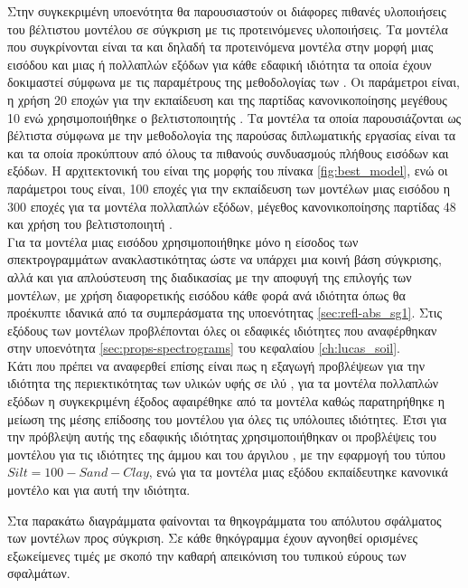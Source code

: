 Στην συγκεκριμένη υποενότητα θα παρουσιαστούν οι διάφορες πιθανές υλοποιήσεις του βέλτιστου μοντέλου σε σύγκριση με τις προτεινόμενες υλοποιήσεις. Τα μοντέλα που συγκρίνονται είναι τα  και  δηλαδή τα προτεινόμενα μοντέλα στην μορφή μιας εισόδου και μιας ή πολλαπλών εξόδων για κάθε εδαφική ιδιότητα τα οποία έχουν δοκιμαστεί σύμφωνα με τις παραμέτρους της μεθοδολογίας των . Οι παράμετροι είναι, η χρήση 20 εποχών για την εκπαίδευση και της παρτίδας κανονικοποίησης μεγέθους 10 ενώ χρησιμοποιήθηκε ο βελτιστοποιητής . Τα μοντέλα τα οποία παρουσιάζονται ως βέλτιστα σύμφωνα με την μεθοδολογία της παρούσας διπλωματικής εργασίας είναι τα  και  τα οποία προκύπτουν από όλους τα πιθανούς συνδυασμούς πλήθους εισόδων και εξόδων. Η αρχιτεκτονική του είναι της μορφής του πίνακα \ref{fig:best_model}, ενώ οι παράμετροι τους είναι, 100 εποχές για την εκπαίδευση των μοντέλων μιας εισόδου η 300 εποχές για τα μοντέλα πολλαπλών εξόδων, μέγεθος κανονικοποίησης παρτίδας 48 και χρήση του βελτιστοποιητή .\\

Για τα μοντέλα μιας εισόδου χρησιμοποιήθηκε μόνο η είσοδος των σπεκτρογραμμάτων ανακλαστικότητας ώστε να υπάρχει μια κοινή βάση σύγκρισης, αλλά και για απλούστευση της διαδικασίας με την αποφυγή της επιλογής των μοντέλων, με χρήση διαφορετικής εισόδου κάθε φορά ανά ιδιότητα όπως θα προέκυπτε ιδανικά από τα συμπεράσματα της υποενότητας \ref{sec:refl-abs_sg1}. Στις εξόδους των μοντέλων προβλέπονται όλες οι εδαφικές ιδιότητες που αναφέρθηκαν στην υποενότητα \ref{sec:props-spectrograms} του κεφαλαίου \ref{ch:lucas_soil}.\\

Κάτι που πρέπει να αναφερθεί επίσης είναι πως η εξαγωγή προβλέψεων για την ιδιότητα της περιεκτικότητας των υλικών υφής σε ιλύ , για τα μοντέλα πολλαπλών εξόδων η συγκεκριμένη έξοδος αφαιρέθηκε από τα μοντέλα καθώς παρατηρήθηκε η μείωση της μέσης επίδοσης του μοντέλου για όλες τις υπόλοιπες ιδιότητες. Έτσι για την πρόβλεψη αυτής της εδαφικής ιδιότητας χρησιμοποιήθηκαν οι προβλέψεις του μοντέλου για τις ιδιότητες της άμμου  και του άργιλου , με την εφαρμογή του τύπου $Silt=100-Sand-Clay$, ενώ για τα μοντέλα μιας εξόδου εκπαίδευτηκε κανονικά μοντέλο και για αυτή την ιδιότητα. 


Στα παρακάτω διαγράμματα φαίνονται τα θηκογράμματα του απόλυτου σφάλματος των μοντέλων προς σύγκριση. Σε κάθε θηκόγραμμα έχουν αγνοηθεί ορισμένες εξωκείμενες τιμές με σκοπό την καθαρή απεικόνιση του τυπικού εύρους των σφαλμάτων.

